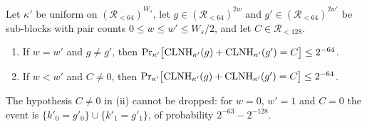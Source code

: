 \begin{lemma}\label{lem:ph:clnh}
Let $\kappa'$ be uniform on $(\mathcal R_{<64})^{W_s}$, let $g\in(\mathcal R_{<64})^{2w}$
and $g'\in(\mathcal R_{<64})^{2w'}$ be sub-blocks with pair counts $0\le w\le w'\le W_s/2$,
and let $C\in\mathcal R_{<128}$.
\begin{enumerate}[label=(\roman*)]
\item If $w=w'$ and $g\ne g'$, then
      $\Pr_{\kappa'}\bigl[\mathrm{CLNH}_{\kappa'}(g)+\mathrm{CLNH}_{\kappa'}(g')=C\bigr]\le 2^{-64}$.
\item If $w<w'$ and $C\ne0$, then
      $\Pr_{\kappa'}\bigl[\mathrm{CLNH}_{\kappa'}(g)+\mathrm{CLNH}_{\kappa'}(g')=C\bigr]\le 2^{-64}$.
\end{enumerate}
The hypothesis $C\ne0$ in (ii) cannot be dropped: for $w=0$, $w'=1$ and $C=0$
the event is $\{k'_0=g'_0\}\cup\{k'_1=g'_1\}$, of probability $2^{-63}-2^{-128}$.
\end{lemma}
